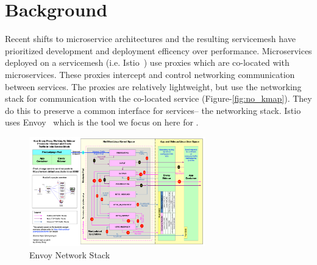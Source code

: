 \section{Background}
\label{sec:background}
Recent shifts to microservice architectures and the resulting servicemesh have prioritized development and deployment efficency over performance.
Microservices deployed on a servicemesh (i.e. Istio~\cite{istio}) use proxies which are co-located with microservices.
These proxies intercept and control networking communication between services.
The proxies are relatively lightweight, but use the networking stack for communication with the co-located service (Figure-\ref{fig:no_kmap}).
They do this to preserve a common interface for services-- the networking stack.
Istio uses Envoy~\cite{envoy} which is the tool we focus on here for \sysname.
\begin{figure}[!htb]
    \begin{minipage}{0.5\textwidth}
        \centering
        \includegraphics[keepaspectratio=true,width=3in]{figures/background/envoy.png}
        \caption{Envoy Network Stack~\cite{envoy_image}}
        \label{fig:envoy}
    \end{minipage}%
\end{figure}

